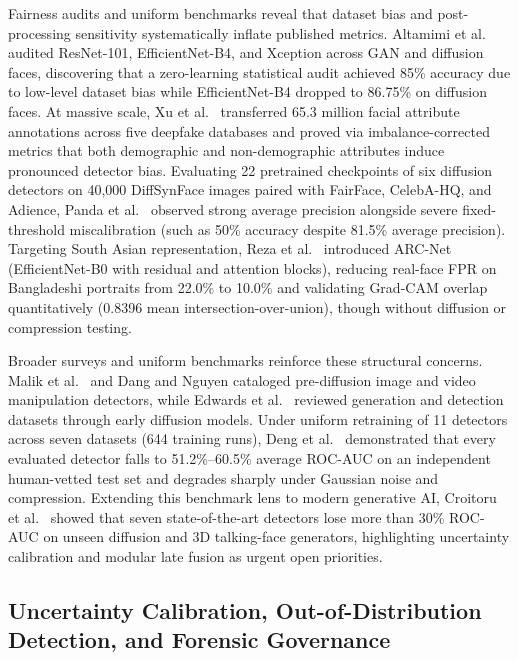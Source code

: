 \documentclass[final,5p,times,twocolumn,numafflabel]{elsarticle}
\begin{document}
Fairness audits and uniform benchmarks reveal that dataset bias and post-processing sensitivity systematically inflate published metrics. Altamimi et al.\ \cite{Altamimi_2026} audited ResNet-101, EfficientNet-B4, and Xception across GAN and diffusion faces, discovering that a zero-learning statistical audit achieved 85\% accuracy due to low-level dataset bias while EfficientNet-B4 dropped to 86.75\% on diffusion faces. At massive scale, Xu et al.\ \cite{Xu_2024} transferred 65.3 million facial attribute annotations across five deepfake databases and proved via imbalance-corrected metrics that both demographic and non-demographic attributes induce pronounced detector bias. Evaluating 22 pretrained checkpoints of six diffusion detectors on 40,000 DiffSynFace images paired with FairFace, CelebA-HQ, and Adience, Panda et al.\ \cite{Panda_2026} observed strong average precision alongside severe fixed-threshold miscalibration (such as 50\% accuracy despite 81.5\% average precision). Targeting South Asian representation, Reza et al.\ \cite{Reza_2026} introduced ARC-Net (EfficientNet-B0 with residual and attention blocks), reducing real-face FPR on Bangladeshi portraits from 22.0\% to 10.0\% and validating Grad-CAM overlap quantitatively (0.8396 mean intersection-over-union), though without diffusion or compression testing.

Broader surveys and uniform benchmarks reinforce these structural concerns. Malik et al.\ \cite{Malik_2022} and Dang and Nguyen \cite{Dang_2023} cataloged pre-diffusion image and video manipulation detectors, while Edwards et al.\ \cite{Edwards_2024} reviewed generation and detection datasets through early diffusion models. Under uniform retraining of 11 detectors across seven datasets (644 training runs), Deng et al.\ \cite{Deng_2024} demonstrated that every evaluated detector falls to 51.2\%--60.5\% average ROC-AUC on an independent human-vetted test set and degrades sharply under Gaussian noise and compression. Extending this benchmark lens to modern generative AI, Croitoru et al.\ \cite{Croitoru_2026} showed that seven state-of-the-art detectors lose more than 30\% ROC-AUC on unseen diffusion and 3D talking-face generators, highlighting uncertainty calibration and modular late fusion as urgent open priorities.

\subsection{Uncertainty Calibration, Out-of-Distribution Detection, and Forensic Governance}
\end{document}
